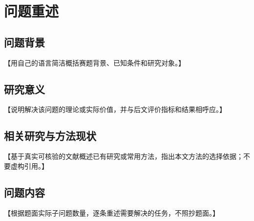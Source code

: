 \section{问题重述}

\subsection{问题背景}

【用自己的语言简洁概括赛题背景、已知条件和研究对象。】

\subsection{研究意义}

【说明解决该问题的理论或实际价值，并与后文评价指标和结果相呼应。】

\subsection{相关研究与方法现状}

【基于真实可核验的文献概述已有研究或常用方法，指出本文方法的选择依据；不要虚构引用。】

\subsection{问题内容}

【根据题面实际子问题数量，逐条重述需要解决的任务，不照抄题面。】

